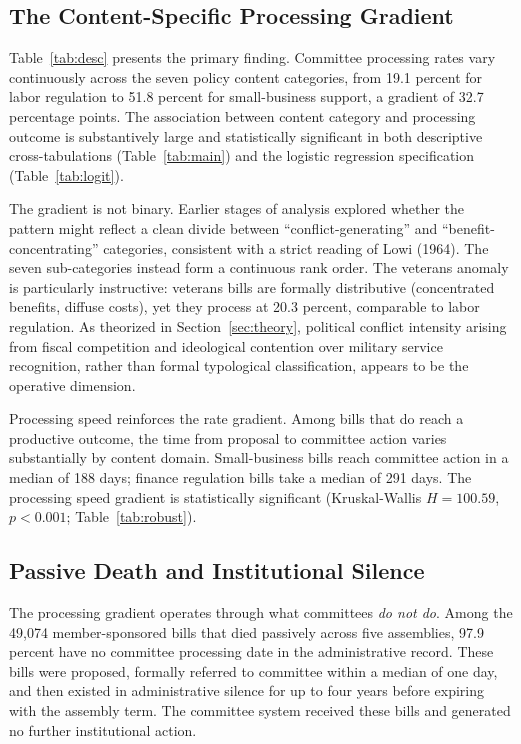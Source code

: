 \documentclass[11pt]{article}
\begin{document}
\subsection{The Content-Specific Processing Gradient}

Table~\ref{tab:desc} presents the primary finding. Committee processing rates vary continuously across the seven policy content categories, from 19.1 percent for labor regulation to 51.8 percent for small-business support, a gradient of 32.7 percentage points. The association between content category and processing outcome is substantively large and statistically significant in both descriptive cross-tabulations (Table~\ref{tab:main}) and the logistic regression specification (Table~\ref{tab:logit}).

The gradient is not binary. Earlier stages of analysis explored whether the pattern might reflect a clean divide between ``conflict-generating'' and ``benefit-concentrating'' categories, consistent with a strict reading of Lowi (1964). The seven sub-categories instead form a continuous rank order. The veterans anomaly is particularly instructive: veterans bills are formally distributive (concentrated benefits, diffuse costs), yet they process at 20.3 percent, comparable to labor regulation. As theorized in Section~\ref{sec:theory}, political conflict intensity arising from fiscal competition and ideological contention over military service recognition, rather than formal typological classification, appears to be the operative dimension.

Processing speed reinforces the rate gradient. Among bills that do reach a productive outcome, the time from proposal to committee action varies substantially by content domain. Small-business bills reach committee action in a median of 188 days; finance regulation bills take a median of 291 days. The processing speed gradient is statistically significant (Kruskal-Wallis $H = 100.59$, $p < 0.001$; Table~\ref{tab:robust}).

\subsection{Passive Death and Institutional Silence}

The processing gradient operates through what committees \textit{do not do}. Among the 49,074 member-sponsored bills that died passively across five assemblies, 97.9 percent have no committee processing date in the administrative record. These bills were proposed, formally referred to committee within a median of one day, and then existed in administrative silence for up to four years before expiring with the assembly term. The committee system received these bills and generated no further institutional action.
\end{document}
